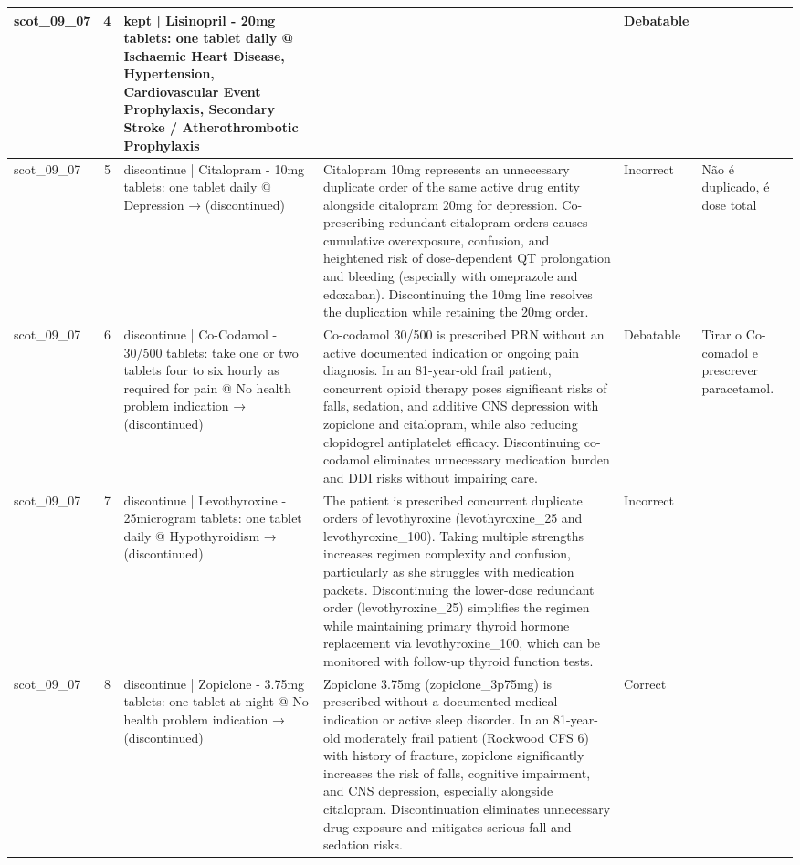 \begin{longtable}{|p{1.45cm}|c|p{3.3cm}|p{6.5cm}|p{1.55cm}|p{2.3cm}|}
\hline
scot\_09\_07 & 4 & kept | Lisinopril - 20mg tablets: one tablet daily @ Ischaemic Heart Disease, Hypertension, Cardiovascular Event Prophylaxis, Secondary Stroke / Atherothrombotic Prophylaxis &  & Debatable &  \\
\hline
scot\_09\_07 & 5 & discontinue | Citalopram - 10mg tablets: one tablet daily @ Depression → (discontinued) & Citalopram 10mg represents an unnecessary duplicate order of the same active drug entity alongside citalopram 20mg for depression. Co-prescribing redundant citalopram orders causes cumulative overexposure, confusion, and heightened risk of dose-dependent QT prolongation and bleeding (especially with omeprazole and edoxaban). Discontinuing the 10mg line resolves the duplication while retaining the 20mg order. & Incorrect & Não é duplicado, é dose total \\
\hline
scot\_09\_07 & 6 & discontinue | Co-Codamol - 30/500 tablets: take one or two tablets four to six hourly as required for pain @ No health problem indication → (discontinued) & Co-codamol 30/500 is prescribed PRN without an active documented indication or ongoing pain diagnosis. In an 81-year-old frail patient, concurrent opioid therapy poses significant risks of falls, sedation, and additive CNS depression with zopiclone and citalopram, while also reducing clopidogrel antiplatelet efficacy. Discontinuing co-codamol eliminates unnecessary medication burden and DDI risks without impairing care. & Debatable & Tirar o Co-comadol e prescrever paracetamol. \\
\hline
scot\_09\_07 & 7 & discontinue | Levothyroxine - 25microgram tablets: one tablet daily @ Hypothyroidism → (discontinued) & The patient is prescribed concurrent duplicate orders of levothyroxine (levothyroxine\_25 and levothyroxine\_100). Taking multiple strengths increases regimen complexity and confusion, particularly as she struggles with medication packets. Discontinuing the lower-dose redundant order (levothyroxine\_25) simplifies the regimen while maintaining primary thyroid hormone replacement via levothyroxine\_100, which can be monitored with follow-up thyroid function tests. & Incorrect &  \\
\hline
scot\_09\_07 & 8 & discontinue | Zopiclone - 3.75mg tablets: one tablet at night @ No health problem indication → (discontinued) & Zopiclone 3.75mg (zopiclone\_3p75mg) is prescribed without a documented medical indication or active sleep disorder. In an 81-year-old moderately frail patient (Rockwood CFS 6) with history of fracture, zopiclone significantly increases the risk of falls, cognitive impairment, and CNS depression, especially alongside citalopram. Discontinuation eliminates unnecessary drug exposure and mitigates serious fall and sedation risks. & Correct &  \\

\end{longtable}
